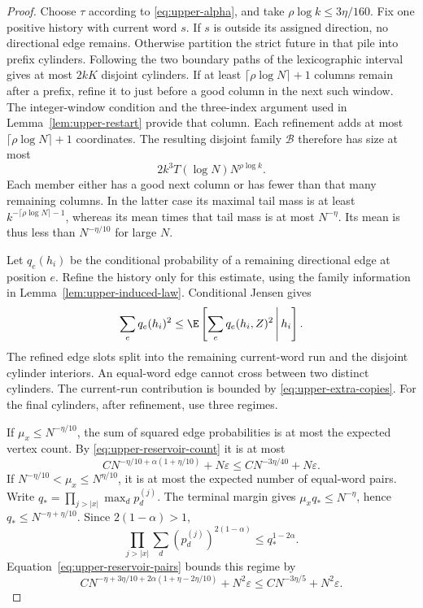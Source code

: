 \begin{proof}
Choose $\tau$ according to \eqref{eq:upper-alpha}, and take
$\rho\log k\le3\eta/160$. Fix one positive history with current
word $s$. If $s$ is outside its assigned direction, no directional
edge remains. Otherwise partition the strict future in that pile
into prefix cylinders. Following the two boundary paths of the
lexicographic interval gives at most $2kK$ disjoint cylinders.
If at least $\lceil\rho\log N\rceil+1$ columns remain after a
prefix, refine it to just before a good column in the next such
window. The integer-window condition and the three-index argument
used in Lemma~\ref{lem:upper-restart} provide that column. Each
refinement adds at most $\lceil\rho\log N\rceil+1$ coordinates.
The resulting disjoint family $\mathcal B$ therefore has size at
most
\begin{equation}\label{eq:upper-future-count}
 2k^3T(\log N)N^{\rho\log k}.
\end{equation}
Each member either has a good next column or has fewer than that
many remaining columns. In the latter case its maximal tail mass
is at least $k^{-\lceil\rho\log N\rceil-1}$, whereas its mean
times that tail mass is at most $N^{-\eta}$. Its mean is thus
less than $N^{-\eta/10}$ for large $N$.

Let $q_e(h_i)$ be the conditional probability of a remaining
directional edge at position $e$. Refine the history only for this
estimate, using the family information in
Lemma~\ref{lem:upper-induced-law}. Conditional Jensen gives
\[
 \sum_e q_e(h_i)^2
 \le\E\left[\sum_e q_e(h_i,Z)^2\,\middle|\,h_i\right].
\]
The refined edge slots split into the remaining current-word run
and the disjoint cylinder interiors. An equal-word edge cannot
cross between two distinct cylinders. The current-run contribution
is bounded by \eqref{eq:upper-extra-copies}. For the final cylinders,
after refinement, use three regimes.

If $\mu_x\le N^{-\eta/10}$, the sum of squared edge probabilities
is at most the expected vertex count. By
\eqref{eq:upper-reservoir-count} it is at most
\[
 CN^{-\eta/10+\alpha(1+\eta/10)}+N\varepsilon
                   \le CN^{-3\eta/40}+N\varepsilon.
\]
If $N^{-\eta/10}<\mu_x\le N^{\eta/10}$, it is at most the
expected number of equal-word pairs. Write
$q_* =\prod_{j>|x|}\max_d p_d^{(j)}$.
The terminal margin gives $\mu_xq_*\le N^{-\eta}$, hence
$q_*\le N^{-\eta+\eta/10}$. Since $2(1-\alpha)>1$,
\[
 \prod_{j>|x|}\sum_d(p_d^{(j)})^{2(1-\alpha)}
                         \le q_*^{1-2\alpha}.
\]
Equation~\eqref{eq:upper-reservoir-pairs} bounds this regime by
\[
 CN^{-\eta+3\eta/10+2\alpha(1+\eta-2\eta/10)}+N^2\varepsilon
                         \le CN^{-3\eta/5}+N^2\varepsilon.
\]


\end{proof}
